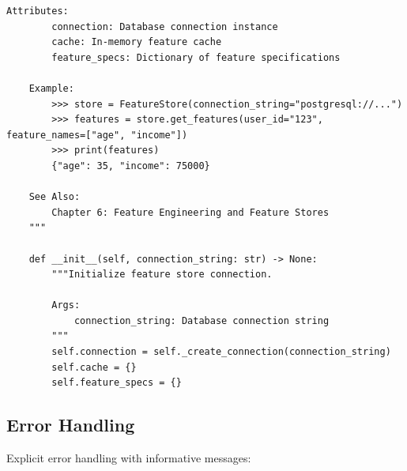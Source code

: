 \begin{lstlisting}[style=python, caption=Docstring Examples]
    Attributes:
        connection: Database connection instance
        cache: In-memory feature cache
        feature_specs: Dictionary of feature specifications

    Example:
        >>> store = FeatureStore(connection_string="postgresql://...")
        >>> features = store.get_features(user_id="123", feature_names=["age", "income"])
        >>> print(features)
        {"age": 35, "income": 75000}

    See Also:
        Chapter 6: Feature Engineering and Feature Stores
    """

    def __init__(self, connection_string: str) -> None:
        """Initialize feature store connection.

        Args:
            connection_string: Database connection string
        """
        self.connection = self._create_connection(connection_string)
        self.cache = {}
        self.feature_specs = {}
\end{lstlisting}

\subsection{Error Handling}

Explicit error handling with informative messages:

